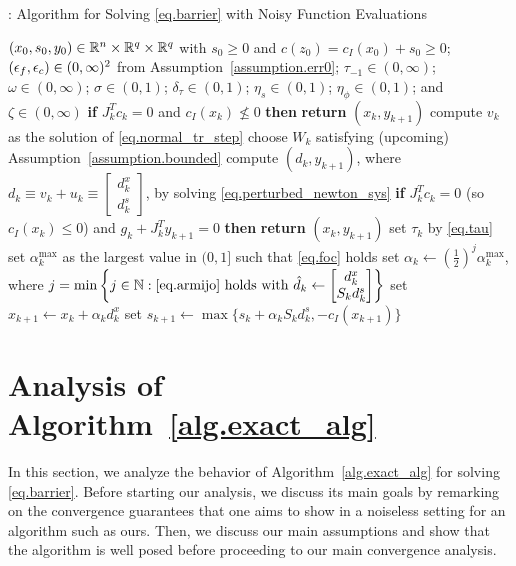 \begin{algorithm}[ht]
  \caption{: Algorithm for Solving \eqref{eq.barrier} with Noisy Function Evaluations}
  \label{alg.exact_alg}
  \begin{algorithmic}[1]
  \Require $(x_0,s_0,y_0) \in \mathbb{R}^n \times \mathbb{R}^q \times \mathbb{R}^q$ with $s_0 \geq 0$ and $c(z_0) = c_I(x_0) + s_0 \geq 0$; $(\epsilon_f,\epsilon_c) \in (0,\infty)^2$ from Assumption~\ref{assumption.err0}; $\tau_{-1} \in (0,\infty)$; $\omega \in (0,\infty)$; $\sigma \in (0,1)$; $\delta_{\tau} \in (0,1)$; $\eta_s \in (0,1)$; $\eta_\phi \in (0,1)$; and $\zeta \in (0,\infty)$
    \State \textbf{if} $J_k^T c_k = 0$ and $c_I(x_k) \not\leq 0$ \textbf{then} \textbf{return} $(x_k,y_{k+1})$ \label{st.tm1}
    \State compute $v_k$ as the solution of \eqref{eq.normal_tr_step}
    \State choose $W_k$ satisfying (upcoming) Assumption~\ref{assumption.bounded}
    \State compute $(d_k,y_{k+1})$, where $d_k \equiv v_k + u_k \equiv \begin{bmatrix} d_k^x \\ d_k^s \end{bmatrix}$, by solving \eqref{eq.perturbed_newton_sys}
    \State \textbf{if} $J_k^T c_k = 0$ (so $c_I(x_k) \leq 0$) and $g_k + J_k^T y_{k+1} = 0$ \textbf{then} \textbf{return} $(x_k,y_{k+1})$ \label{st.tm2}
    \State set $\tau_k$ by \eqref{eq.tau} \label{step.tau}
    \State set $\alpha_k^{\max}$ as the largest value in $(0,1]$ such that \eqref{eq.foc} holds \label{step.alpha_max}
    \State set $\alpha_k \gets (\frac12)^j \alpha_k^{\max}$, where $j = \min \left\{j \in \mathbb{N}: \text{\eqref{eq.armijo} holds with ${\hat d}_k \gets \begin{bmatrix} d_k^x \\ S_k d_k^s \end{bmatrix}$}\right\}$ \label{step.alpha}
    \State set $x_{k+1} \gets x_k + \alpha_k d_k^x$
    \State set $s_{k+1} \gets \max\{s_k + \alpha_k S_k d_k^s, -c_I(x_{k+1})\}$\label{step.slack_reset}
  \EndFor
  \end{algorithmic}
\end{algorithm}

\section{Analysis of Algorithm~\ref{alg.exact_alg}}\label{sec.analysis}

In this section, we analyze the behavior of Algorithm~\ref{alg.exact_alg} for solving \eqref{eq.barrier}.  Before starting our analysis, we discuss its main goals by remarking on the convergence guarantees that one aims to show in a noiseless setting for an algorithm such as ours.  Then, we discuss our main assumptions and show that the algorithm is well posed before proceeding to our main convergence analysis.

